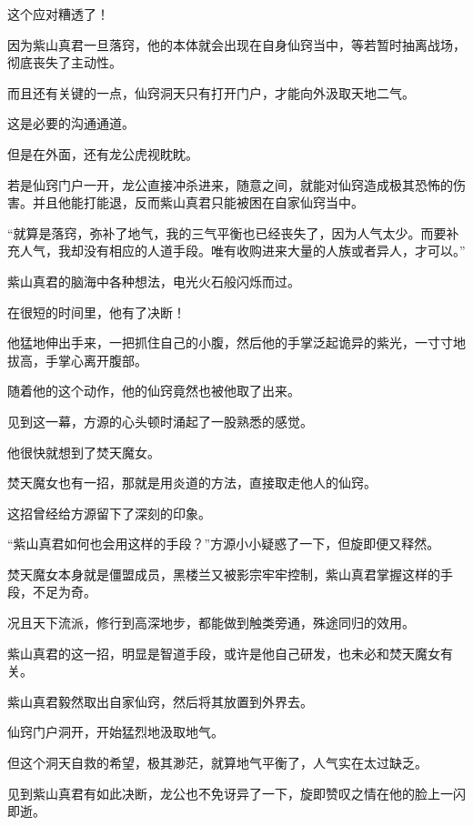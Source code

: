 \begin{this_body}
这个应对糟透了！

因为紫山真君一旦落窍，他的本体就会出现在自身仙窍当中，等若暂时抽离战场，彻底丧失了主动性。

而且还有关键的一点，仙窍洞天只有打开门户，才能向外汲取天地二气。

这是必要的沟通通道。

但是在外面，还有龙公虎视眈眈。

若是仙窍门户一开，龙公直接冲杀进来，随意之间，就能对仙窍造成极其恐怖的伤害。并且他能打能退，反而紫山真君只能被困在自家仙窍当中。

“就算是落窍，弥补了地气，我的三气平衡也已经丧失了，因为人气太少。而要补充人气，我却没有相应的人道手段。唯有收购进来大量的人族或者异人，才可以。”

紫山真君的脑海中各种想法，电光火石般闪烁而过。

在很短的时间里，他有了决断！

他猛地伸出手来，一把抓住自己的小腹，然后他的手掌泛起诡异的紫光，一寸寸地拔高，手掌心离开腹部。

随着他的这个动作，他的仙窍竟然也被他取了出来。

见到这一幕，方源的心头顿时涌起了一股熟悉的感觉。

他很快就想到了焚天魔女。

焚天魔女也有一招，那就是用炎道的方法，直接取走他人的仙窍。

这招曾经给方源留下了深刻的印象。

“紫山真君如何也会用这样的手段？”方源小小疑惑了一下，但旋即便又释然。

焚天魔女本身就是僵盟成员，黑楼兰又被影宗牢牢控制，紫山真君掌握这样的手段，不足为奇。

况且天下流派，修行到高深地步，都能做到触类旁通，殊途同归的效用。

紫山真君的这一招，明显是智道手段，或许是他自己研发，也未必和焚天魔女有关。

紫山真君毅然取出自家仙窍，然后将其放置到外界去。

仙窍门户洞开，开始猛烈地汲取地气。

但这个洞天自救的希望，极其渺茫，就算地气平衡了，人气实在太过缺乏。

见到紫山真君有如此决断，龙公也不免讶异了一下，旋即赞叹之情在他的脸上一闪即逝。

\end{this_body}

